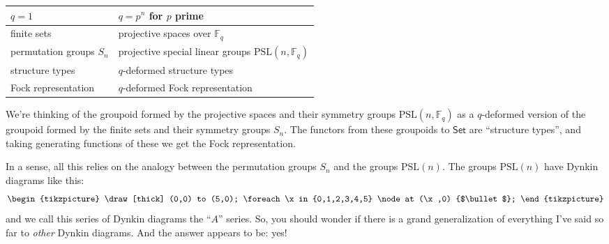 \documentclass{article}
\begin{document}
\begin{longtable}[]{@{}ll@{}}
\toprule
\begin{minipage}[b]{0.38\columnwidth}\raggedright
\(q=1\)\strut
\end{minipage} & \begin{minipage}[b]{0.56\columnwidth}\raggedright
\(q=p^n\) for \(p\) prime\strut
\end{minipage}\tabularnewline
\midrule
\endhead
\begin{minipage}[t]{0.38\columnwidth}\raggedright
finite sets\strut
\end{minipage} & \begin{minipage}[t]{0.56\columnwidth}\raggedright
projective spaces over \(\mathbb{F}_q\)\strut
\end{minipage}\tabularnewline
\begin{minipage}[t]{0.38\columnwidth}\raggedright
permutation groups \(S_n\)\strut
\end{minipage} & \begin{minipage}[t]{0.56\columnwidth}\raggedright
projective special linear groups \(\mathrm{PSL}(n,\mathbb{F}_q)\)\strut
\end{minipage}\tabularnewline
\begin{minipage}[t]{0.38\columnwidth}\raggedright
structure types\strut
\end{minipage} & \begin{minipage}[t]{0.56\columnwidth}\raggedright
\(q\)-deformed structure types\strut
\end{minipage}\tabularnewline
\begin{minipage}[t]{0.38\columnwidth}\raggedright
Fock representation\strut
\end{minipage} & \begin{minipage}[t]{0.56\columnwidth}\raggedright
\(q\)-deformed Fock representation\strut
\end{minipage}\tabularnewline
\bottomrule
\end{longtable}

We're thinking of the groupoid formed by the projective spaces and their
symmetry groups \(\mathrm{PSL}(n,\mathbb{F}_q)\) as a \(q\)-deformed
version of the groupoid formed by the finite sets and their symmetry
groups \(S_n\). The functors from these groupoids to \(\mathsf{Set}\)
are ``structure types'', and taking generating functions of these we get
the Fock representation.

In a sense, all this relies on the analogy between the permutation
groups \(S_n\) and the groups \(\mathrm{PSL}(n)\). The groups
\(\mathrm{PSL}(n)\) have Dynkin diagrams like this: \[
  \begin{tikzpicture}
    \draw[thick] (0,0) to (5,0);
    \foreach \x in {0,1,2,3,4,5}
      \node at (\x,0) {$\bullet$};
  \end{tikzpicture}
\] and we call this series of Dynkin diagrams the ``\(A\)'' series. So,
you should wonder if there is a grand generalization of everything I've
said so far to \emph{other} Dynkin diagrams. And the answer appears to
be: yes!
\end{document}
